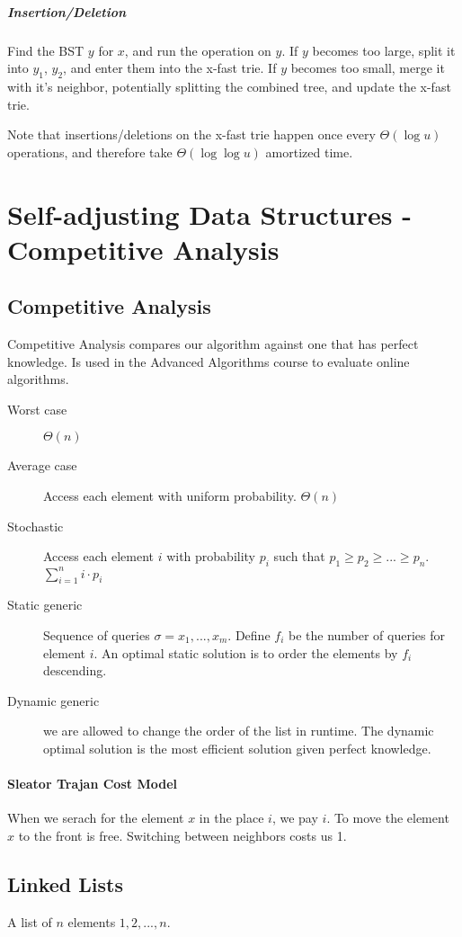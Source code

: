 \documentclass[a4paper]{article}
\begin{document}
\subparagraph{Insertion/Deletion}
Find the BST $y$ for $x$, and run the operation on $y$. If $y$ becomes too large, split it into $y_1$, $y_2$, and enter them into the x-fast trie. If $y$ becomes too small, merge it with it's neighbor, potentially splitting the combined tree, and update the x-fast trie.

Note that insertions/deletions on the x-fast trie happen once every $\Theta(\log u)$ operations, and therefore take $\Theta(\log\log u)$ amortized time.

\section{Self-adjusting Data Structures - Competitive Analysis}

\subsection{Competitive Analysis}
Competitive Analysis compares our algorithm against one that has perfect knowledge. Is used in the Advanced Algorithms course to evaluate online algorithms.

\begin{description}
  \item[Worst case] $\Theta(n)$
  \item[Average case] Access each element with uniform probability. $\Theta(n)$
  \item[Stochastic] Access each element $i$ with probability $p_i$ such that $p_1 \ge p_2 \ge ... \ge p_n$. $\sum_{i=1}^n i\cdot p_i$
  \item[Static generic] Sequence of queries $\sigma=x_1,...,x_m$. Define $f_i$ be the number of queries for element $i$. An optimal static solution is to order the elements by $f_i$ descending.
  \item[Dynamic generic] we are allowed to change the order of the list in runtime. The dynamic optimal solution is the most efficient solution given perfect knowledge.
\end{description}

\paragraph{Sleator Trajan Cost Model}
When we serach for the element $x$ in the place $i$, we pay $i$.
To move the element $x$ to the front is free.
Switching between neighbors costs us 1.

\subsection{Linked Lists}
A list of $n$ elements $1,2,...,n$.
\end{document}

